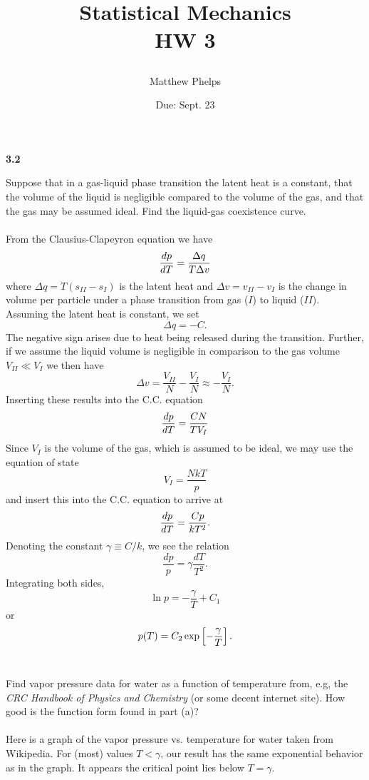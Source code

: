 \documentclass[11pt,letterpaper]{article}
\title{\begin{spacing}{1.2}Statistical Mechanics\\HW 3\end{spacing}}
\author{Matthew Phelps}
\date{Due: Sept. 23}
\begin{document}
\maketitle

\benum
  	\item[\textbf{3.2}]
	\benum
		\item
		Suppose that in a gas-liquid phase transition the latent heat is a constant, that the volume of the liquid is negligible compared 
		to the volume of the gas, and that the gas may be assumed ideal. Find the liquid-gas coexistence curve.
		\\
		\\
		From the Clausius-Clapeyron equation we have
		\[
			\diff[p]{T} = \frac{\Delta q}{T\Delta v}
		\]
		where $\Delta q = T(s_{II}-s_I)$ is the latent heat and $\Delta v = v_{II}-v_I$ is the change in volume per particle under a phase
		transition from gas ($I$) to liquid ($II$). Assuming the latent heat is constant, we set
		\[	
			\Delta q = -C.
		\]
		The negative sign arises due to heat being released during the transition. 
		Further, if we assume the liquid volume is negligible in comparison to the gas volume $V_{II} \ll V_I$ we then have
		\[
			\Delta v = \frac{V_{II}}{N}-\frac{V_I}{N} \approx -\frac{V_I}{N}.
		\]
		Inserting these results into the C.C. equation
		\[
			\diff[p]{T} = \frac{CN}{TV_I}
		\]
		Since $V_I$ is the volume of the gas, which is assumed to be ideal, we may use the equation of state
		\[
			V_I = \frac{NkT}{p}
		\]
		and insert this into the C.C. equation to arrive at
		\[
			\diff[p]{T} = \frac{Cp}{kT^2}.
		\]
		Denoting the constant $\gamma \equiv C/k$, we see the relation
		\[
			\frac{dp}{p} = \gamma \frac{dT}{T^2}.
		\]
		Integrating both sides,
		\[
			\ln p = -\frac{\gamma}{T}+C_1
		\]
		or
		\[
			p(T) = C_2\exp\blr{-\frac{\gamma}{T}}. 
		\]
		\\
		\item
		Find vapor pressure data for water as a function of temperature from, e.g, the \emph{CRC Handbook of Physics and Chemistry} 
		(or some decent internet site). How good is the function form found in part (a)?
		\\
		\\
		Here is a graph of the vapor pressure vs. temperature for water taken from Wikipedia. For (most) values $T<\gamma$, our result
		 has the same exponential behavior as in the graph. It appears the critical point lies below $T=\gamma$. 
		\eenum
		
\end{document}
